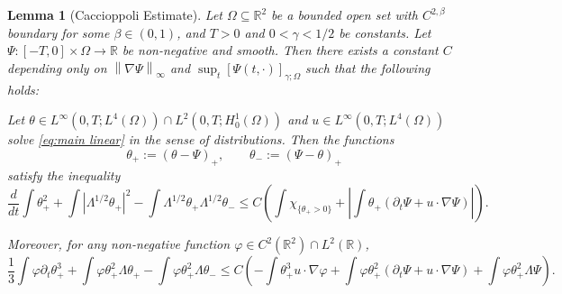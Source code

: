 \documentclass[11pt]{amsart}
\newtheorem{lemma}[theorem]{Lemma}
\theoremstyle{remark}
\theoremstyle{definition}
\newcommand{\R}{\mathbb{R}}
\newcommand{\norm}[1]{\left\lVert#1\right\rVert}
\newcommand{\paren}[1]{\left( #1 \right)}
\newcommand{\bracket}[1]{\left[ #1 \right]}
\newcommand{\abs}[1]{\left\lvert #1 \right\rvert}
\newcommand{\del}{\partial}
\newcommand{\grad}{\nabla}
\newcommand{\ddt}{\frac{d}{dt}}
\newcommand{\indic}[1]{\chi_{\{#1\}}}
\begin{document}
\begin{lemma}[Caccioppoli Estimate] \label{thm:caccioppoli}
Let $\Omega \subseteq \R^2$ be a bounded open set with $C^{2,\beta}$ boundary for some $\beta \in (0,1)$, and $T> 0$ and $0<\gamma<1/2$ be constants.  Let $\Psi: [-T,0]\times \Omega \to \R$ be non-negative and smooth.  Then there exists a constant $C$ depending only on $\norm{\grad \Psi}_\infty$ and $\sup_t \bracket{\Psi(t,\cdot)}_{\gamma; \Omega}$ such that the following holds:
\vskip0.3cm

Let $\theta \in L^\infty(0,T; L^4(\Omega)) \cap L^2(0,T;H_0^1(\Omega))$ and $u \in L^\infty(0,T; L^4(\Omega))$ solve \eqref{eq:main linear} in the sense of distributions.  Then the functions
\[ \theta_+ := \paren{\theta - \Psi}_+, \qquad \theta_- := \paren{\Psi - \theta}_+ \]
satisfy the inequality
\[ \ddt \int \theta_+^2 + \int \abs{\Lambda^{1/2} \theta_+}^2 - \int \Lambda^{1/2} \theta_+ \Lambda^{1/2} \theta_- \leq C \paren{ \int \indic{\theta_+ > 0} + \abs{\int \theta_+ (\del_t \Psi + u\cdot\grad\Psi)} }. \]

Moreover, for any non-negative function $\varphi \in C^2(\R^2) \cap L^2(\R)$,
\begin{equation} \label{second energy inequality} \frac{1}{3} \int \varphi \del_t \theta_+^3 + \int \varphi \theta_+^2 \Lambda \theta_+ - \int \varphi \theta_+^2 \Lambda \theta_- \leq C \paren{ -\int \theta_+^3 u \cdot \grad \varphi + \int \varphi \theta_+^2 (\del_t \Psi + u \cdot \grad \Psi) + \int \varphi \theta_+^2 \Lambda \Psi}. \end{equation}

\end{lemma}
\end{document}
